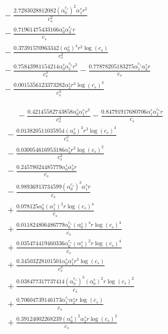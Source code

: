 \documentclass[10pt]{article}
\begin{document}
\begin{align*}
&{}  - \frac{2.7283028812082 \left(\alpha_{0}^{c_s}\right)^{2} \alpha_{1}^s r^{2}}{c_{s}^{2}} \\
&{}  - \frac{0.71961475433166 \alpha_{0}^s \alpha_{3}^{c_s} r}{c_{s}} \\
&{}  - \frac{0.37391570963342 \left(\alpha_{0}^s\right)^{4} r^{2} \log{\left(c_{s} \right)}}{c_{s}^{2}} \\
&{}  - \frac{0.75843981154214 \alpha_{0}^s \alpha_{1}^{c_s} r^{3}}{c_{s}^{3}} - \frac{0.77878205183275 \alpha_{1}^{c_s} \alpha_{2}^s r}{c_{s}} \\
&{}  - \frac{0.0015356123373282 \alpha_{2}^s r^{3} \log{\left(c_{s} \right)}^{3}}{c_{s}^{3}}
\end{align*}

\begin{align*}
\phantom{R_{0,6}} &\phantom{={}}{}  - \frac{0.42145582743858 \alpha_{0}^s \alpha_{1}^s r^{3}}{c_{s}^{3}} - \frac{0.84791917680706 \alpha_{1}^s \alpha_{2}^{c_s} r}{c_{s}} \\
&{}  - \frac{0.013820511035954 \left(\alpha_{0}^s\right)^{3} r^{3} \log{\left(c_{s} \right)}^{3}}{c_{s}^{3}} \\
&{}  - \frac{0.030054616953186 \alpha_{3}^s r^{2} \log{\left(c_{s} \right)}^{2}}{c_{s}^{2}} \\
&{}  - \frac{0.24578024485779 \alpha_{0}^s \alpha_{3}^s r}{c_{s}} \\
&{}  - \frac{0.98936913734599 \left(\alpha_{0}^{c_s}\right)^{3} \alpha_{1}^s r}{c_{s}} \\
&{}  + \frac{0.078125 \alpha_{0}^s \left(\alpha_{1}^s\right)^{2} r \log{\left(c_{s} \right)}^{4}}{c_{s}} \\
&{}  + \frac{0.011824806486779 \alpha_{0}^{c_s} \left(\alpha_{0}^s\right)^{4} r \log{\left(c_{s} \right)}^{4}}{c_{s}} \\
&{}  + \frac{0.035474419460336 \alpha_{0}^{c_s} \left(\alpha_{1}^s\right)^{2} r \log{\left(c_{s} \right)}^{4}}{c_{s}} \\
&{}  + \frac{0.34503228101501 \alpha_{0}^s \alpha_{1}^s r^{3} \log{\left(c_{s} \right)}}{c_{s}^{3}} \\
&{}  + \frac{0.038477317737414 \left(\alpha_{0}^{c_s}\right)^{3} \left(\alpha_{0}^s\right)^{2} r \log{\left(c_{s} \right)}^{2}}{c_{s}} \\
&{}  + \frac{0.70604739146173 \alpha_{1}^{c_s} \alpha_{2}^s r \log{\left(c_{s} \right)}}{c_{s}} \\
&{}  + \frac{0.39124002268239 \left(\alpha_{0}^s\right)^{2} \alpha_{2}^s r \log{\left(c_{s} \right)}^{2}}{c_{s}} \\

\end{align*}
\end{document}
